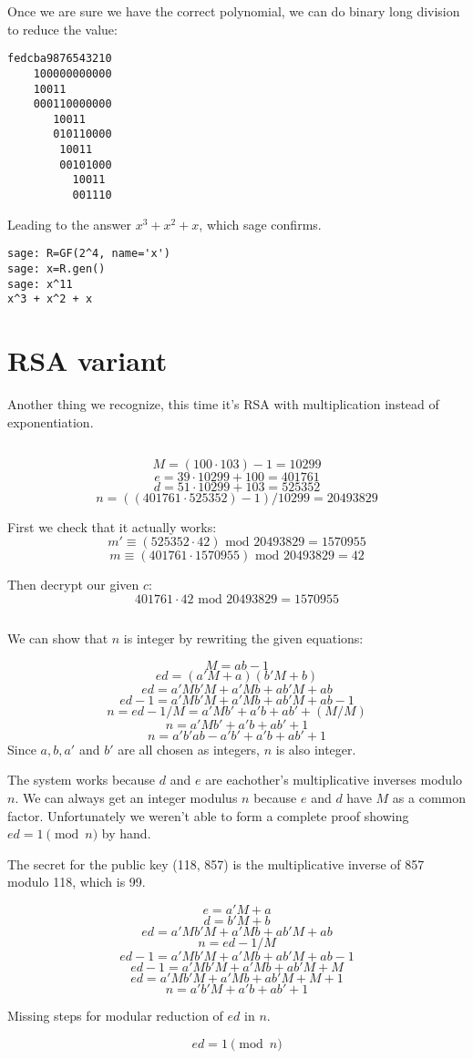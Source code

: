 \documentclass{article}
\begin{document}
Once we are sure we have the correct polynomial, we can do binary long division to reduce the value:

\begin{verbatim}
fedcba9876543210
    100000000000
    10011
    000110000000
       10011
       010110000
        10011
        00101000
          10011
          001110
\end{verbatim}

Leading to the answer $x^3 + x^2 + x$, which sage confirms.

\begin{verbatim}
sage: R=GF(2^4, name='x')
sage: x=R.gen()
sage: x^11
x^3 + x^2 + x
\end{verbatim}

\section{RSA variant}
Another thing we recognize, this time it's RSA with multiplication instead of exponentiation.

\subsection{}
\[M = (100 \cdot 103)-1=10299 \]
\[e = 39 \cdot 10299 + 100 = 401761\]
\[d = 51 \cdot 10299 + 103 = 525352\]
\[n = ((401761 \cdot 525352)-1)/10299 = 20493829\]

First we check that it actually works:
\[m'\equiv (525352 \cdot 42) \mbox{ mod 20493829} = 1570955\]
\[m\equiv (401761 \cdot 1570955) \mbox{ mod 20493829} = 42\]

Then decrypt our given $c$:
\[ 401761 \cdot 42 \mbox{ mod 20493829} = 1570955 \]


\subsection{}
We can show that $n$ is integer by rewriting the given equations:

\[M=ab-1 \]
\[ed=(a'M+a)(b'M+b)\]
\[ed=a'Mb'M + a'Mb + ab'M + ab \]
\[ed-1=a'Mb'M + a'Mb + ab'M + ab-1 \]
\[n=ed-1/M=a'Mb' + a'b  + ab' + (M/M) \]
\[n=a'Mb' + a'b  + ab' + 1 \]
\[n=a'b'ab - a'b' + a'b  + ab' + 1 \]
Since $a, b, a'$ and $b'$ are all chosen as integers, $n$ is also integer.

The system works because $d$ and $e$ are eachother's multiplicative inverses modulo $n$.
We can always get an integer modulus $n$ because $e$ and $d$ have $M$ as a common factor.
Unfortunately we weren't able to form a complete proof showing $ed = 1 \pmod n$ by hand.

The secret for the public key (118, 857) is the multiplicative inverse of 857 modulo 118, which is 99.

\[ e = a'M + a \]
\[ d = b'M + b \]
\[ ed = a'Mb'M + a'Mb + ab'M + ab \]
\[ n = ed-1/M \]
\[ ed-1 = a'Mb'M + a'Mb + ab'M + ab -1 \]
\[ ed-1 = a'Mb'M + a'Mb + ab'M + M \]
\[ ed = a'Mb'M + a'Mb + ab'M + M + 1 \]
\[ n =  a'b'M + a'b + ab' + 1 \]

Missing steps for modular reduction of $ed$ in $n$.

\[ ed = 1 \pmod n \]
\end{document}
